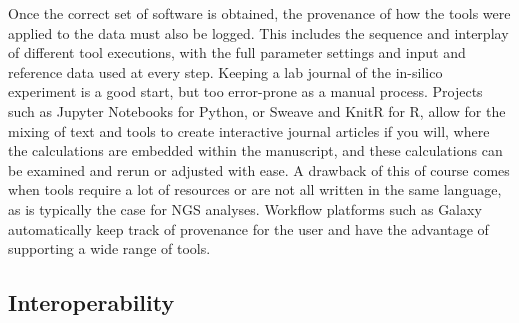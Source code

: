 Once the correct set of software is obtained, the provenance of how the tools were applied to the data must also be logged. This includes the sequence and interplay of different tool executions, with the full parameter settings and input and reference data used at every step. Keeping a lab journal of the in-silico experiment is a good start, but too error-prone as a manual process. Projects such as Jupyter Notebooks \cite{kluyver2016jupyter} for Python, or Sweave \cite{leisch2002sweave} and KnitR \cite{xie2014knitr} for R, allow for the mixing of text and tools to create interactive journal articles if you will, where the calculations are embedded within the manuscript, and these calculations can be examined and rerun or adjusted with ease. A drawback of this of course comes when tools require a lot of resources or are not all written in the same language, as is typically the case for NGS analyses. Workflow platforms such as Galaxy \cite{} automatically keep track of provenance for the user and have the advantage of supporting a wide range of tools.

\subsection{Interoperability}

